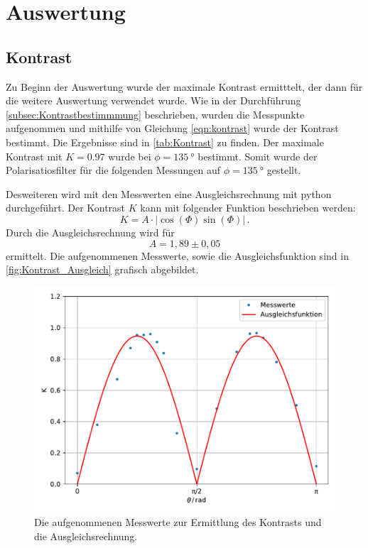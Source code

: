 \section{Auswertung}
\label{sec:Auswertung}

\subsection{Kontrast}
\label{subsec:Kontrast}
Zu Beginn der Auswertung wurde der maximale Kontrast ermitttelt, der dann für die weitere Auswertung verwendet wurde.
Wie in der Durchführung \ref{subsec:Kontrastbestimmmung} beschrieben, wurden die Messpunkte aufgenommen und mithilfe von Gleichung \eqref{eqn:kontrast} wurde der Kontrast bestimmt.
Die Ergebnisse sind in \autoref{tab:Kontrast} zu finden.
Der maximale Kontrast mit $K = \num{0.97}$ wurde bei $\phi = \SI{135}{\degree}$ bestimmt.
Somit wurde der Polarisatiosfilter für die folgenden Messungen auf $\phi = \SI{135}{\degree}$ gestellt.

\noindent
Desweiteren wird mit den Messwerten eine Ausgleichsrechnung mit python durchgeführt.
Der Kontrast $K$ kann mit folgender Funktion beschrieben werden:
\begin{equation*}
  K = A \cdot | \cos(\Phi)\sin(\Phi) | \, .
\end{equation*}
Durch die Ausgleichsrechnung wird für 
\begin{equation*}
  A = 1,89 \pm 0,05
\end{equation*} 
ermittelt.
Die aufgenommenen Messwerte, sowie die Ausgleichsfunktion sind in \autoref{fig:Kontrast_Ausgleich} grafisch abgebildet.

\begin{figure}[H]
  \centering
  \includegraphics[width=\textwidth]{build/kontrast_ausgleich.pdf}
  \caption{Die aufgenommenen Messwerte zur Ermittlung des Kontrasts und die Ausgleichsrechnung.}
  \label{fig:Kontrast_Ausgleich}
\end{figure}

